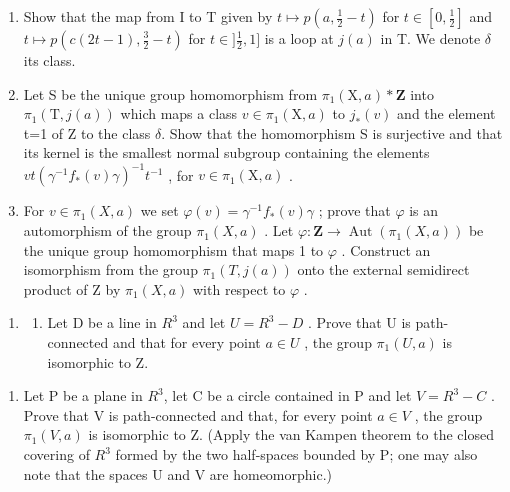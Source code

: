 \begin{enumerate}
\def\labelenumi{\alph{enumi})}
\item
  Show that the map from I to T given by \(t \mapsto p(a, \frac{1}{2} - t)\) for \(t \in [0, \frac{1}{2}]\) and \(t \mapsto p(c(2t - 1), \frac{3}{2} - t)\) for \(t \in ]\frac{1}{2}, 1]\) is a loop at \(j(a)\) in T. We denote \(\delta\) its class.
\item
  Let S be the unique group homomorphism from \(\pi_{1}(\mathrm{X},a)*\mathbf{Z}\) into \(\pi_{1}(\mathrm{T},j(a))\) which maps a class \(v\in\pi_{1}(\mathrm{X},a)\) to \(j_{*}(v)\) and the element t=1 of Z to the class \(\delta\). Show that the homomorphism S is surjective and that its kernel is the smallest normal subgroup containing the elements \(vt(\gamma^{-1}f_{*}(v)\gamma)^{-1}t^{-1}\) , for \(v\in\pi_{1}(\mathrm{X},a)\) .
\item
  For \(v \in \pi_{1}(X, a)\) we set \(\varphi(v) = \gamma^{-1} f_{*}(v) \gamma\) ; prove that \(\varphi\) is an automorphism of the group \(\pi_{1}(X, a)\) . Let \(\varphi: \mathbf{Z} \to \operatorname{Aut}(\pi_{1}(X, a))\) be the unique group homomorphism that maps 1 to \(\varphi\) . Construct an isomorphism from the group \(\pi_{1}(T, j(a))\) onto the external semidirect product of Z by \(\pi_{1}(X, a)\) with respect to \(\varphi\) .
\end{enumerate}

\begin{enumerate}
\def\labelenumi{\arabic{enumi})}
\setcounter{enumi}{11}
\tightlist
\item
  \begin{enumerate}
  \def\labelenumii{\alph{enumii})}
  \tightlist
  \item
    Let D be a line in \(R^{3}\) and let \(U = R^{3} - D\) . Prove that U is path-connected and that for every point \(a \in U\) , the group \(\pi_{1}(U, a)\) is isomorphic to Z.
  \end{enumerate}
\end{enumerate}

\begin{enumerate}
\def\labelenumi{\alph{enumi})}
\setcounter{enumi}{1}
\tightlist
\item
  Let P be a plane in \(R^{3}\), let C be a circle contained in P and let \(V = R^{3} - C\) . Prove that V is path-connected and that, for every point \(a \in V\) , the group \(\pi_{1}(V, a)\) is isomorphic to Z. (Apply the van Kampen theorem to the closed covering of \(R^{3}\) formed by the two half-spaces bounded by P; one may also note that the spaces U and V are homeomorphic.)
\end{enumerate}

